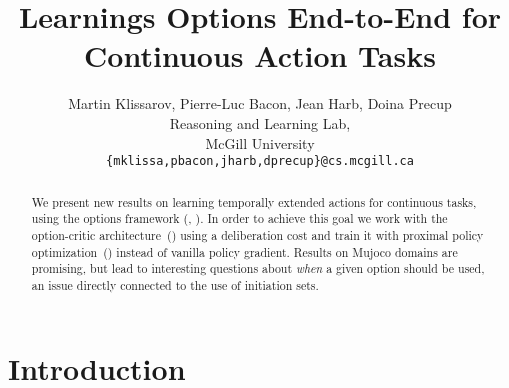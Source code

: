 \documentclass{article}
\title{Learnings Options End-to-End for Continuous Action Tasks}
\author{Martin Klissarov, Pierre-Luc Bacon, Jean Harb, Doina Precup\\
Reasoning and Learning Lab,\\
McGill University \\
{\tt \{mklissa,pbacon,jharb,dprecup\}@cs.mcgill.ca}
}
\begin{document}



\maketitle

\begin{abstract}
  We present new results on learning temporally extended actions for continuous tasks, using the options framework (\cite{SuttonPrecupSingh1999}, \cite{Precup2000}). In order to achieve this goal we work with the option-critic architecture~(\cite{Bacon2017}) using a deliberation cost and train it with proximal policy optimization~(\cite{SchulmanWDRK17}) instead of vanilla policy gradient. Results on Mujoco domains are promising, but lead to interesting questions about \textit{when} a given option should be used, an issue directly connected to the use of initiation sets.
  
 
  

\end{abstract}
\vspace*{-8pt}

\section{Introduction}
\vspace*{-8pt}
\end{document}
